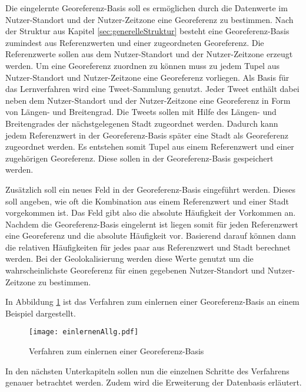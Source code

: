 			Die eingelernte Georeferenz-Basis soll es ermöglichen durch die Datenwerte im Nutzer-Standort und der Nutzer-Zeitzone eine Georeferenz zu bestimmen.
			Nach der Struktur aus Kapitel \ref{sec:generelleStruktur} besteht eine Georeferenz-Basis zumindest aus Referenzwerten und einer zugeordneten Georeferenz.
			Die Referenzwerte sollen aus dem Nutzer-Standort und der Nutzer-Zeitzone erzeugt werden.
			Um eine Georeferenz zuordnen zu können muss zu jedem Tupel aus Nutzer-Standort und Nutzer-Zeitzone eine Georeferenz vorliegen.
			Als Basis für das Lernverfahren wird eine Tweet-Sammlung genutzt.
			Jeder Tweet enthält dabei neben dem Nutzer-Standort und der Nutzer-Zeitzone eine Georeferenz in Form von Längen- und Breitengrad. 
			Die Tweets sollen mit Hilfe des Längen- und Breitengrades der nächstgelegenen Stadt zugeordnet werden. 
			Dadurch kann jedem Referenzwert in der Georeferenz-Basis später eine Stadt als Georeferenz zugeordnet werden.
			Es entstehen somit Tupel aus einem Referenzwert und einer zugehörigen Georeferenz.
			Diese sollen in der Georeferenz-Basis gespeichert werden.

			Zusätzlich soll ein neues Feld in der Georeferenz-Basis eingeführt werden.
			Dieses soll angeben, wie oft die Kombination aus einem Referenzwert und einer Stadt vorgekommen ist. 
			Das Feld gibt also die absolute Häufigkeit der Vorkommen an.
			Nachdem die Georeferenz-Basis eingelernt ist liegen somit für jeden Referenzwert eine Georeferenz und die absolute Häufigkeit vor.
			Basierend darauf können dann die relativen Häufigkeiten für jedes paar aus Referenzwert und Stadt berechnet werden.
			Bei der Geolokalisierung werden diese Werte genutzt um die wahrscheinlichste Georeferenz für einen gegebenen Nutzer-Standort und Nutzer-Zeitzone zu bestimmen.

			In Abbildung \ref{img:EinlernenAllg} ist das Verfahren zum einlernen einer Georeferenz-Basis an einem Beispiel dargestellt.

			\begin{figure}[h!]
					\begin{center}
						\texttt{[image: einlernenAllg.pdf]}
						\caption{Verfahren zum einlernen einer Georeferenz-Basis}
						\label{img:EinlernenAllg}
					\end{center}
			\end{figure}	

			In den nächsten Unterkapiteln sollen nun die einzelnen Schritte des Verfahrens genauer betrachtet werden. 
			Zudem wird die Erweiterung der Datenbasis erläutert.

